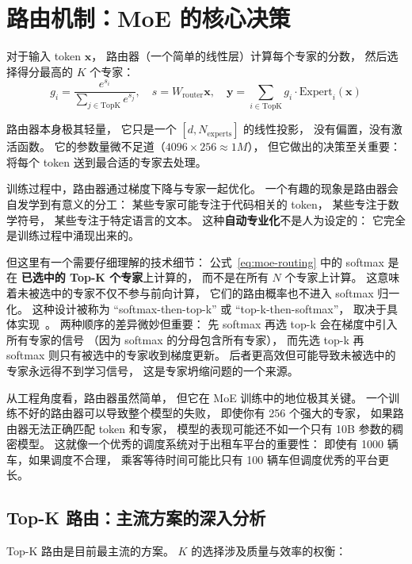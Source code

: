 \section{路由机制：MoE 的核心决策}

对于输入 token $\mathbf{x}$，
路由器（一个简单的线性层）计算每个专家的分数，
然后选择得分最高的 $K$ 个专家：
\begin{equation}
  g_i = \frac{e^{s_i}}{\sum_{j \in \mathrm{TopK}} e^{s_j}}, \quad
  s = W_{\mathrm{router}} \mathbf{x}, \quad
  \mathbf{y} = \sum_{i \in \mathrm{TopK}} g_i \cdot \mathrm{Expert}_i(\mathbf{x})
  \label{eq:moe-routing}
\end{equation}

路由器本身极其轻量，
它只是一个 $[d, N_{\mathrm{experts}}]$ 的线性投影，
没有偏置，没有激活函数。
它的参数量微不足道（$4096 \times 256 \approx 1M$），
但它做出的决策至关重要：
将每个 token 送到最合适的专家去处理。

训练过程中，路由器通过梯度下降与专家一起优化。
一个有趣的现象是路由器会自发学到有意义的分工：
某些专家可能专注于代码相关的 token，
某些专注于数学符号，
某些专注于特定语言的文本。
这种\textbf{自动专业化}不是人为设定的：
它完全是训练过程中涌现出来的。

但这里有一个需要仔细理解的技术细节：
公式~\ref{eq:moe-routing} 中的 softmax 是在
\textbf{已选中的 Top-K 个专家}上计算的，
而不是在所有 $N$ 个专家上计算。
这意味着未被选中的专家不仅不参与前向计算，
它们的路由概率也不进入 softmax 归一化。
这种设计被称为 “softmax-then-top-k” 或 “top-k-then-softmax”，
取决于具体实现~\cite{shazeer2017moe}。
两种顺序的差异微妙但重要：
先 softmax 再选 top-k 会在梯度中引入所有专家的信号
（因为 softmax 的分母包含所有专家），
而先选 top-k 再 softmax 则只有被选中的专家收到梯度更新。
后者更高效但可能导致未被选中的专家永远得不到学习信号，
这是专家坍缩问题的一个来源。

从工程角度看，路由器虽然简单，
但它在 MoE 训练中的地位极其关键。
一个训练不好的路由器可以导致整个模型的失败，
即使你有 256 个强大的专家，
如果路由器无法正确匹配 token 和专家，
模型的表现可能还不如一个只有 10B 参数的稠密模型。
这就像一个优秀的调度系统对于出租车平台的重要性：
即使有 1000 辆车，如果调度不合理，
乘客等待时间可能比只有 100 辆车但调度优秀的平台更长。

\subsection{Top-K 路由：主流方案的深入分析}

Top-K 路由是目前最主流的方案。
$K$ 的选择涉及质量与效率的权衡：


